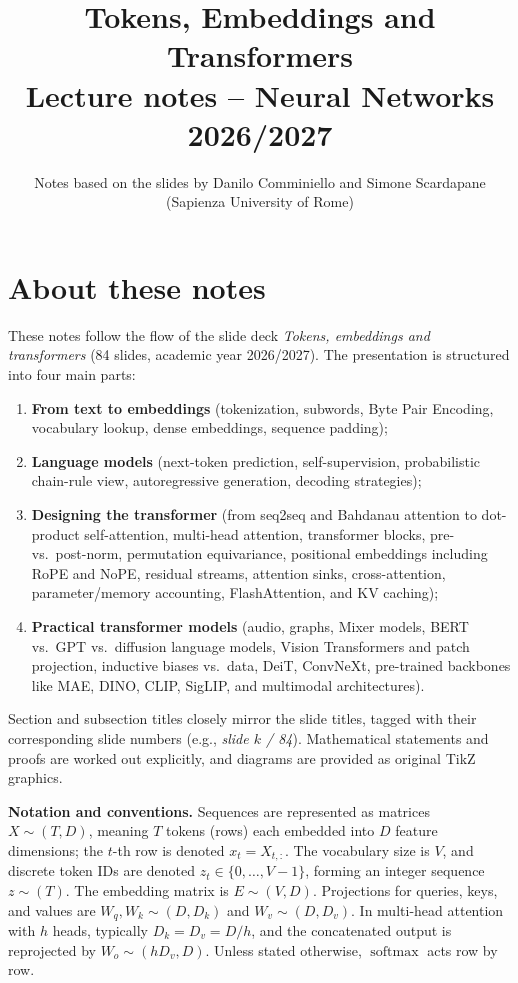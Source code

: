 \documentclass[11pt,a4paper]{article}
\title{\textbf{Tokens, Embeddings and Transformers}\\[2pt]\large Lecture notes -- Neural Networks 2026/2027}
\author{Notes based on the slides by Danilo Comminiello and Simone Scardapane (Sapienza University of Rome)}
\date{}
\DeclareMathOperator{\softmax}{softmax}
\theoremstyle{definition}
\theoremstyle{plain}
\begin{document}
\maketitle
\tableofcontents

\section*{About these notes}
These notes follow the flow of the slide deck \emph{Tokens, embeddings and transformers} (84 slides, academic year 2026/2027). The presentation is structured into four main parts:
\begin{enumerate}[nosep]
\item \textbf{From text to embeddings} (tokenization, subwords, Byte Pair Encoding, vocabulary lookup, dense embeddings, sequence padding);
\item \textbf{Language models} (next-token prediction, self-supervision, probabilistic chain-rule view, autoregressive generation, decoding strategies);
\item \textbf{Designing the transformer} (from seq2seq and Bahdanau attention to dot-product self-attention, multi-head attention, transformer blocks, pre- vs.\ post-norm, permutation equivariance, positional embeddings including RoPE and NoPE, residual streams, attention sinks, cross-attention, parameter/memory accounting, FlashAttention, and KV caching);
\item \textbf{Practical transformer models} (audio, graphs, Mixer models, BERT vs.\ GPT vs.\ diffusion language models, Vision Transformers and patch projection, inductive biases vs.\ data, DeiT, ConvNeXt, pre-trained backbones like MAE, DINO, CLIP, SigLIP, and multimodal architectures).
\end{enumerate}
Section and subsection titles closely mirror the slide titles, tagged with their corresponding slide numbers (e.g., \emph{slide $k$ / 84}). Mathematical statements and proofs are worked out explicitly, and diagrams are provided as original TikZ graphics.

\medskip
\noindent\textbf{Notation and conventions.} Sequences are represented as matrices $X \sim (T, D)$, meaning $T$ tokens (rows) each embedded into $D$ feature dimensions; the $t$-th row is denoted $x_t = X_{t,:}$. The vocabulary size is $V$, and discrete token IDs are denoted $z_t \in \{0, \dots, V-1\}$, forming an integer sequence $z \sim (T)$. The embedding matrix is $E \sim (V, D)$. Projections for queries, keys, and values are $W_q, W_k \sim (D, D_k)$ and $W_v \sim (D, D_v)$. In multi-head attention with $h$ heads, typically $D_k = D_v = D/h$, and the concatenated output is reprojected by $W_o \sim (h D_v, D)$. Unless stated otherwise, $\softmax$ acts row by row.
\end{document}

